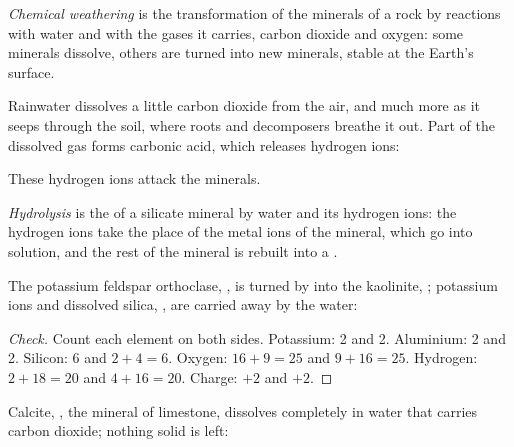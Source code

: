 \begin{definition}\label{def:g10:soil-formation:chemical-weathering}
\emph{Chemical weathering} is the transformation
of the minerals of a rock by reactions with water and with the gases it
carries, carbon dioxide and oxygen: some minerals dissolve, others are turned
into new minerals, stable at the Earth's surface.
\end{definition}

Rainwater dissolves a little carbon dioxide from the air, and much more as it
seeps through the soil, where roots and decomposers breathe it out. Part of
the dissolved gas forms carbonic acid, which releases hydrogen ions:
\begin{center}
\end{center}
These hydrogen ions attack the minerals.

\begin{definition}[Hydrolysis]\label{def:g10:soil-formation:hydrolysis}
\emph{Hydrolysis} is the  of a silicate
mineral by water and its hydrogen ions: the hydrogen ions take the place of
the metal ions of the mineral, which go into solution, and the rest of the
mineral is rebuilt into a .
\end{definition}

\begin{proposition}\label{prop:g10:soil-formation:hydrolysis}
The potassium feldspar orthoclase, , is turned by 
into the  kaolinite, ; potassium ions and
dissolved silica, , are carried away by the water:
\begin{center}
\end{center}
\end{proposition}

\begin{proof}[Check]
Count each element on both sides. Potassium: 2 and 2. Aluminium: 2 and 2.
Silicon: 6 and $2 + 4 = 6$. Oxygen: $16 + 9 = 25$ and $9 + 16 = 25$.
Hydrogen: $2 + 18 = 20$ and $4 + 16 = 20$. Charge: $+2$ and $+2$.
\end{proof}

\begin{proposition}\label{prop:g10:soil-formation:calcite}
Calcite, , the mineral of limestone, dissolves completely in water
that carries carbon dioxide; nothing solid is left:
\begin{center}
\end{center}
\end{proposition}

